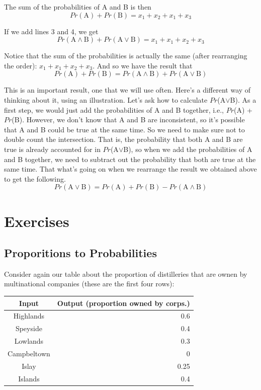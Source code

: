 \documentclass[]{tufte-book}
\begin{document}
The sum of the probabilities of A and B is then
\[
Pr(\text{A}) + Pr(\text{B}) = x_1 + x_2 + x_1 + x_3
\]

If we add lines 3 and 4, we get
\[
Pr(\text{A}\wedge\text{B}) + Pr(\text{A}\vee\text{B}) = x_1 + x_1 + x_2 + x_3
\]

Notice that the sum of the probabilities is actually the same (after rearranging the order): \(x_1 + x_1 + x_2 + x_3\). And so we have the result that
\[
Pr(\text{A}) + Pr(\text{B}) = Pr(\text{A}\wedge\text{B}) + Pr(\text{A}\vee\text{B})
\]

This is an important result, one that we will use often. Here's a different way of thinking about it, using an illustration. Let's ask how to calculate \(Pr\)(A\(\vee\)B). As a first step, we would just add the probabilities of A and B together, i.e., \(Pr\)(A) + \(Pr\)(B). However, we don't know that A and B are inconsistent, so it's possible that A and B could be true at the same time. So we need to make sure not to double count the intersection. That is, the probability that both A and B are true is already accounted for in \(Pr\)(A\(\vee\)B), so when we add the probabilities of A and B together, we need to subtract out the probability that both are true at the same time. That what's going on when we rearrange the result we obtained above to get the following.
\[
 Pr(\text{A}\vee\text{B}) = Pr(\text{A}) + Pr(\text{B}) - Pr(\text{A}\wedge\text{B}) 
\]

\hypertarget{exercises-8}{%
\section{Exercises}\label{exercises-8}}

\hypertarget{proporitions-to-probabilities}{%
\subsection{Proporitions to Probabilities}\label{proporitions-to-probabilities}}

Consider again our table about the proportion of distilleries that are ownen by multinational companies (these are the first four rows):

\begin{longtable}[]{@{}cr@{}}
\toprule
Input & Output (proportion owned by corps.)\tabularnewline
\midrule
\endhead
Highlands & 0.6\tabularnewline
Speyside & 0.4\tabularnewline
Lowlands & 0.3\tabularnewline
Campbeltown & 0\tabularnewline
Islay & 0.25\tabularnewline
Islands & 0.4\tabularnewline
\bottomrule
\end{longtable}
\end{document}
